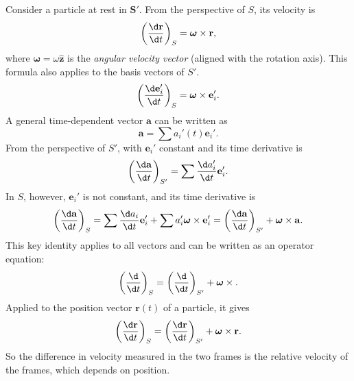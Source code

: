 \documentclass[a4paper]{article}
\begin{document}
Consider a particle at rest in $\mathbf{S}'$. From the perspective of $S$, its velocity is
\[
  \left(\frac{\d \mathbf{r}}{\d t}\right)_S = \boldsymbol\omega\times \mathbf{r},
\]
where $\boldsymbol\omega = \omega\hat{\mathbf{z}}$ is the \emph{angular velocity vector} (aligned with the rotation axis). This formula also applies to the basis vectors of $S'$.
\[
  \left(\frac{\d \mathbf{e}_i'}{\d t}\right)_S = \boldsymbol\omega\times \mathbf{e}_i'.
\]
A general time-dependent vector $\mathbf{a}$ can be written as
\[
  \mathbf{a} = \sum a_i'(t) \mathbf{e}_i'.
\]
From the perspective of $S'$, with $\mathbf{e}_i'$ constant and its time derivative is
\[
  \left(\frac{\d \mathbf{a}}{\d t}\right)_{S'} = \sum \frac{\d a_i'}{\d t}\mathbf{e}_i'.
\]
In $S$, however, $\mathbf{e}_i'$ is not constant, and its time derivative is
\[
  \left(\frac{\d \mathbf{a}}{\d t}\right)_S = \sum \frac{\d a_i}{\d t}\mathbf{e}_i' + \sum a_i'\boldsymbol\omega \times \mathbf{e}_i' = \left(\frac{\d \mathbf{a}}{\d t}\right)_{S'} + \boldsymbol\omega \times \mathbf{a}.
\]
This key identity applies to all vectors and can be written as an operator equation:
\[
  \left(\frac{\d}{\d t}\right)_S = \left(\frac{\d}{\d t}\right)_{S'} + \boldsymbol\omega \times.
\]
Applied to the position vector $\mathbf{r}(t)$ of a particle, it gives
\[
  \left(\frac{\d \mathbf{r}}{\d t}\right)_S = \left(\frac{\d \mathbf{r}}{\d t}\right)_{S'} + \boldsymbol\omega \times \mathbf{r}.
\]
So the difference in velocity measured in the two frames is the relative velocity of the frames, which depends on position.
\end{document}
